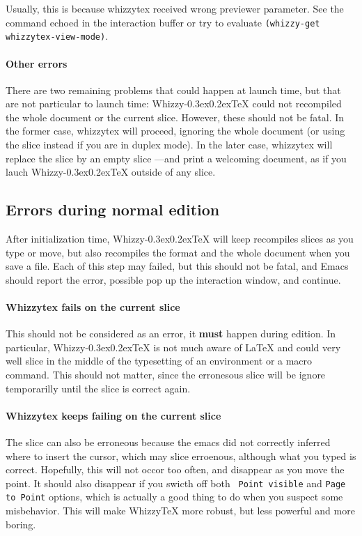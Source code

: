 \documentclass{article}
\makeatletter
\let \lst \verb
\def \whizzy {{Whizzy\kern -0.3ex\raise 0.2ex\hbox{\let \@\relax\TeX}}}
\makeatother
\begin{document}
Usually, this is because whizzytex received wrong previewer parameter.  See
the command echoed in the interaction buffer or try to evaluate
\lst"(whizzy-get whizzytex-view-mode)".

\paragraph {Other errors}

There are two remaining problems that could happen at launch time, but that
are not particular to launch time: {\whizzy} could not recompiled the whole 
document or the current slice. However, these should not be fatal. 
In the former case, whizzytex will proceed, ignoring the whole document 
(or using the slice instead if you are in duplex mode). In the later case,
whizzytex will replace the slice by an empty slice ---and print a welcoming
document, as if you lauch {\whizzy} outside of any slice. 

\subsection {Errors during normal edition}

After initialization time, {\whizzy} will keep recompiles slices as you
type or move, but also recompiles the format and the whole document when you
save a file. Each of this step may failed, but this should not be fatal, and
Emacs should report the error, possible pop up the interaction window, and
continue. 

\paragraph {Whizzytex fails on the current slice}

This should not be considered as an error, it {\bf must} happen during
edition. In particular, {\whizzy} is not much aware of {\LaTeX} and could
very well slice in the middle of the typesetting of an environment or a
macro command. This should not matter, since the erronesous slice will be
ignore temporarilly until the slice is correct again.

\paragraph {Whizzytex keeps failing on the current slice}

The slice can also be erroneous because the emacs did not correctly inferred
where to insert the cursor, which may slice erroenous, although what you
typed is correct. Hopefully, this will not occor too often, and disappear as
you move the point. It should also disappear if you swicth off both {\tt
Point visible} and {\tt Page to Point} options, which is actually a good
thing to do when you suspect some misbehavior.  This will make WhizzyTeX
more robust, but less powerful and more boring.
\end{document}
